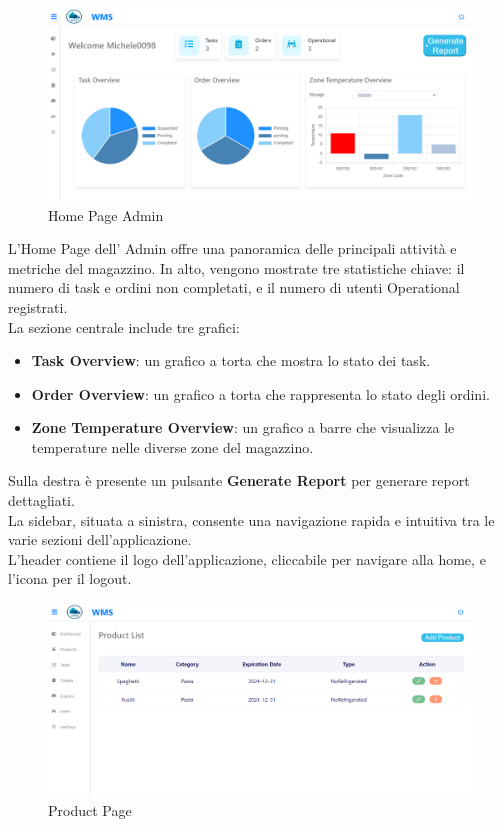 \begin{figure}[H]
    \centering
    \includegraphics[width=\textwidth]{document/sections/img/Storyboard/homePageAdmin.png}
    \caption{Home Page Admin}
    \label{fig:homePageAdmins}
\end{figure}

L'Home Page dell' Admin offre una panoramica delle principali attività e metriche del magazzino.
In alto, vengono mostrate tre statistiche chiave: il numero di task e ordini non completati, e il numero di utenti
Operational registrati.\\

La sezione centrale include tre grafici:
\begin{itemize}
    \item \textbf{Task Overview}: un grafico a torta che mostra lo stato dei task.
    \item \textbf{Order Overview}: un grafico a torta che rappresenta lo stato degli ordini.
    \item \textbf{Zone Temperature Overview}: un grafico a barre che visualizza le temperature nelle diverse zone del magazzino.
\end{itemize}

Sulla destra è presente un pulsante \textbf{Generate Report} per generare report dettagliati.\\
La sidebar, situata a sinistra, consente una navigazione rapida e intuitiva tra le varie sezioni dell'applicazione.\\
L'header contiene il logo dell'applicazione, cliccabile per navigare alla home, e l'icona per il logout.

\begin{figure}[H]
    \centering
    \includegraphics[width=\textwidth]{document/sections/img/Storyboard/productPage.png}
    \caption{Product Page}
    \label{fig:productPages}
\end{figure}

